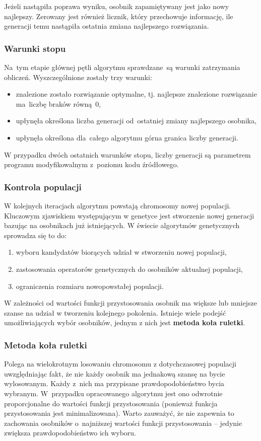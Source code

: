 \documentclass[12pt,a4paper]{article}
\theoremstyle{definition}
\begin{document}
\noindent
Jeżeli nastąpiła poprawa wyniku, osobnik zapamiętywany jest jako nowy najlepszy.
Zerowany jest również licznik, który przechowuje informację, ile generacji temu nastąpiła ostatnia zmiana najlepszego rozwiązania. 

\subsubsection{Warunki stopu}
Na~tym etapie głównej pętli algorytmu sprawdzane~są warunki zatrzymania obliczeń.
Wyszczególnione zostały trzy warunki:
\begin{itemize}
	\item znalezione zostało rozwiązanie optymalne, tj. najlepsze znalezione rozwiązanie ma~liczbę braków równą~0,
	\item upłynęła określona liczba generacji od~ostatniej zmiany najlepszego osobnika,
	\item upłynęła określona dla~całego algorytmu górna granica liczby generacji.
\end{itemize}
W przypadku dwóch ostatnich warunków stopu, liczby generacji są parametrem programu modyfikowalnym z~poziomu kodu źródłowego.

\subsubsection{Kontrola populacji}
W kolejnych iteracjach algorytmu powstają chromosomy nowej populacji. Kluczowym zjawiskiem występującym w genetyce jest stworzenie nowej generacji bazując na osobnikach już istniejących. W świecie algorytmów genetycznych sprowadza się to do:
\begin{enumerate}
	\item wyboru kandydatów biorących udział w stworzeniu nowej populacji,
	\item zastosowania operatorów genetycznych do osobników aktualnej populacji,
	\item ograniczenia rozmiaru nowopowstałej populacji.
\end{enumerate}
W zależności od wartości funkcji przystosowania osobnik ma większe lub mniejsze szanse na udział w tworzeniu kolejnego pokolenia. Istnieje wiele podejść umożliwiających wybór osobników, jednym z nich jest \textbf{metoda koła ruletki}.

\subsubsection*{Metoda koła ruletki}
Polega na wielokrotnym losowaniu chromosomu z dotychczasowej populacji uwzględniając fakt, że nie każdy osobnik ma jednakową szansę na bycie wylosowanym. Każdy z~nich ma przypisane prawdopodobieństwo bycia wybranym.
W~przypadku opracowanego algorytmu jest ono odwrotnie proporcjonalne do wartości funkcji przystosowania (ponieważ funkcja przystosowania jest minimalizowana). Warto zauważyć, że nie zapewnia to zachowania osobników o~najniższej wartości funkcji przystosowania -- jedynie zwiększa prawdopodobieństwo ich wyboru.\\
\end{document}
